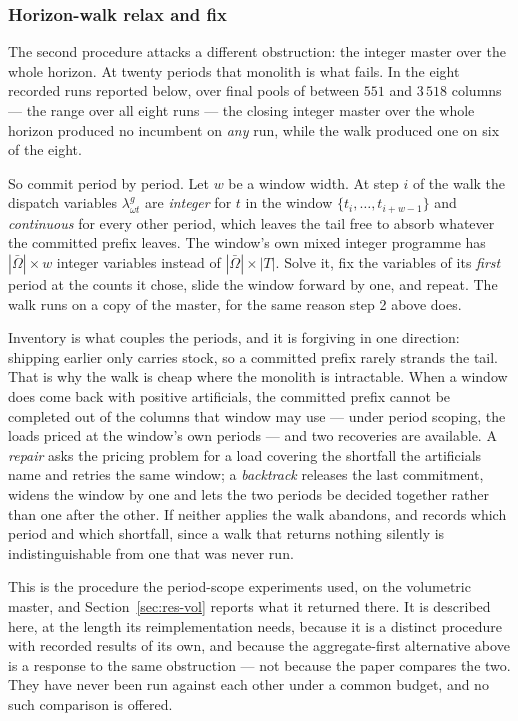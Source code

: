 \subsubsection{Horizon-walk relax and fix}
\label{sec:relaxfix-walk}

The second procedure attacks a different obstruction: the integer
master over the whole horizon. At twenty periods that monolith is what
fails. In the eight recorded runs reported below, over final pools of
between $551$ and $3\,518$ columns --- the range over all eight runs ---
the closing integer master over the whole horizon produced no incumbent
on \emph{any} run, while the walk produced one on six of the eight.

So commit period by period. Let $w$ be a window width. At step $i$ of
the walk the dispatch variables $\lambda^{g}_{\omega t}$ are
\emph{integer} for $t$ in the window $\{t_{i},\dots,t_{i+w-1}\}$ and
\emph{continuous} for every other period, which leaves the tail free to
absorb whatever the committed prefix leaves. The window's own mixed
integer programme has $|\bar\Omega|\times w$ integer variables instead
of $|\bar\Omega|\times|T|$. Solve it, fix the variables of its
\emph{first} period at the counts it chose, slide the window forward by
one, and repeat. The walk runs on a copy of the master, for the same
reason step 2 above does.

Inventory is what couples the periods, and it is forgiving in one
direction: shipping earlier only carries stock, so a committed prefix
rarely strands the tail. That is why the walk is cheap where the
monolith is intractable. When a window does come back with positive
artificials, the committed prefix cannot be completed out of the
columns that window may use --- under period scoping, the loads priced
at the window's own periods --- and two recoveries are available. A
\emph{repair} asks the pricing problem for a load covering the
shortfall the artificials name and retries the same window; a
\emph{backtrack} releases the last commitment, widens the window by one
and lets the two periods be decided together rather than one after the
other. If neither applies the walk abandons, and records which period
and which shortfall, since a walk that returns nothing silently is
indistinguishable from one that was never run.

This is the procedure the period-scope experiments used, on the
volumetric master, and Section~\ref{sec:res-vol} reports what it
returned there. It is described here, at the length its reimplementation
needs, because it is a distinct procedure with recorded results of its
own, and because the aggregate-first alternative above is a response to
the same obstruction --- not because the paper compares the two. They
have never been run against each other under a common budget, and no
such comparison is offered.


